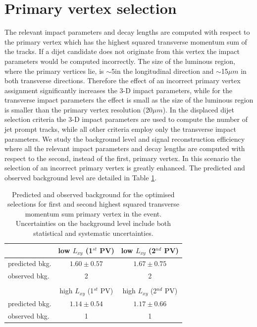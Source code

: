 \section{Primary vertex selection}
\label{subsec:pv}
The relevant impact parameters and decay lengths are computed 
with respect to the primary vertex which has the highest
squared transverse momentum sum of the tracks. If a dijet candidate does not originate from this vertex the impact
parameters would be computed incorrectly. The size of the luminous region, where the primary vertices lie,
 is $\sim$5\cm in the longitudinal direction and $\sim$15$\mu m$ in both transverse directions. 
Therefore the effect of an incorrect primary vertex assignment significantly increases the 3-D impact parameters,
 while for
the transverse impact parameters the effect is small as the size of the luminous region is smaller than the 
primary vertex resolution (20$\mu m$).
In the displaced dijet selection criteria the 3-D impact parameters are used to compute 
the number of jet prompt tracks, while all other criteria employ
only the transverse impact parameters. 
 We study the background level and signal reconstruction efficiency where all
 the relevant impact parameters and
decay lengths are computed with respect to the second, instead of the first, primary vertex. In this scenario 
the selection of an incorrect primary vertex is greatly enhanced. The predicted and
observed background level are detailed in Table \ref{tab:wrongvtx}.

\begin{table}[htbp]
\centering
\caption{Predicted and observed background for the optimised selections for first and second highest squared transverse momentum sum primary vertex in the event. Uncertainties on the background level include both statistical
and systematic uncertainties. \label{tab:wrongvtx}}
\begin{tabular}{lcc}
\\
 & low $L_{xy}$ (1$^{st}$ PV) & low $L_{xy}$ (2$^{nd}$ PV) \\
\hline
predicted bkg. & $1.60\pm0.57$ & $1.67\pm0.75$ \\
observed bkg. & 2 & 2 \\
\hline
\\
 &  high $L_{xy}$ (1$^{st}$ PV) & high $L_{xy}$ (2$^{nd}$ PV)\\
\hline
predicted bkg. & $1.14\pm0.54$ & $1.17\pm0.66$ \\
observed bkg. & 1 & 1 \\
\hline
\end{tabular}
\end{table}


